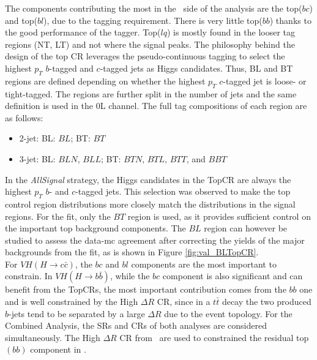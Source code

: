The components contributing the most in the \vhc\ side of the analysis are the top($bc$) and top($bl$), due to the tagging requirement. There is very little top($bb$) thanks to the good performance of the tagger. Top($lq$) is mostly found in the looser tag regions (NT, LT) and not where the signal peaks. The philosophy behind the design of the top CR leverages the pseudo-continuous tagging to select the highest $p_T$ $b$-tagged and $c$-tagged jets as Higgs candidates. Thus, BL and BT regions are defined depending on whether the highest $p_T$ $c$-tagged jet is loose- or tight-tagged. The regions are further split in the number of jets and the same definition is used in the 0L channel. The full tag compositions of each region are as follows:

\begin{itemize}
\item 2-jet: \quad BL: $BL$;  \quad BT: $BT$
\item 3-jet: \quad BL: $BLN$, $BLL$;  \quad BT: $BTN$, $BTL$, $BTT$, and $BBT$
\end{itemize}
In the \textit{AllSignal} strategy, the Higgs candidates in the TopCR are always the highest $p_T$ $b$- and $c$-tagged jets. This selection was observed to make the top control region distributions more closely match the distributions in the signal regions. For the fit, only the $BT$ region is used, as it provides sufficient control on the important top background components. The $BL$ region can however be studied to assess the data-\gls{mc} agreement after correcting the yields of the major backgrounds from the fit, as is shown in Figure \ref{fig:val_BLTopCR}. \\

For $VH(H\rightarrow c\bar{c})$, the $bc$ and $bl$ components are the most important to constrain. In $VH(H\rightarrow b\bar{b})$, while the $bc$ component is also significant and can benefit from the TopCRs, the most important contribution comes from the $bb$ one and is well constrained by the High $\Delta R$ CR, since in a $t\bar{t}$ decay the two produced $b$-jets tend to be separated by a large $\Delta R$ due to the event topology. For the Combined Analysis, the SRs and CRs of both analyses are considered simultaneously. The High $\Delta R$ CR from \vhb\ are used to constrained the residual top$(bb)$ component in \vhc. \\

\newpage

